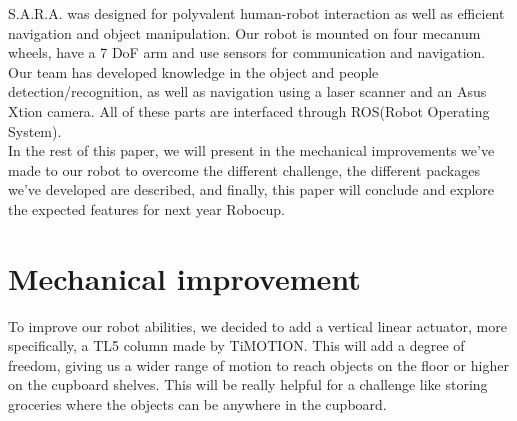 \documentclass[runningheads,a4paper]{llncs}
\begin{document}
S.A.R.A. was designed for polyvalent human-robot interaction as well as efficient navigation and object manipulation. Our robot is mounted on four mecanum wheels, have a 7 DoF arm and use sensors for communication and navigation. Our team has developed knowledge in the object and people detection/recognition, as well as navigation using a laser scanner and an Asus Xtion camera. All of these parts are interfaced through ROS(Robot Operating System). \\

In the rest of this paper, we will present in the mechanical improvements we've made to our robot to overcome the different challenge, the different packages we've developed are described, and finally, this paper will conclude and explore the expected features for next year Robocup.


\section{Mechanical improvement}

\tab To improve our robot abilities, we decided to add a vertical linear actuator, more specifically, a TL5 column made by TiMOTION. This will add a degree of freedom, giving us a wider range of motion to reach objects on the floor or higher on the cupboard shelves. This will be really helpful for a challenge like storing groceries where the objects can be anywhere in the cupboard. \\
\end{document}
